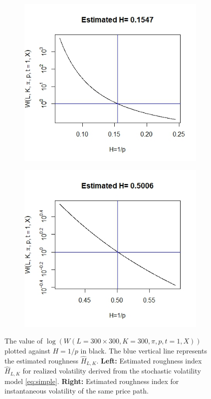\documentclass{article}
\begin{document}
\begin{figure}[htbp]
    \centering
    
    \begin{subfigure}{0.48\textwidth}
        \includegraphics[width=\linewidth]{ex6_RVw.jpeg}
    \end{subfigure}
    \hfill
    \begin{subfigure}{0.48\textwidth}
        \includegraphics[width=\linewidth]{ex6_IVw.jpeg}
    \end{subfigure}
    
    \caption{The value of $\log(W(L=300\times 300, K=300, \pi, p, t=1, X))$ plotted against $H=1/p$ in black. The blue vertical line represents the estimated roughness $\hat{H}_{L,K}$. \textbf{Left:} Estimated roughness index $\hat{H}_{L,K}$ for realized volatility derived from the stochastic volatility model \eqref{eq:simple}. \textbf{Right:} Estimated roughness index for instantaneous volatility of the same price path.}
    \label{fig:ex6w}
\end{figure}\\\\
\end{document}
